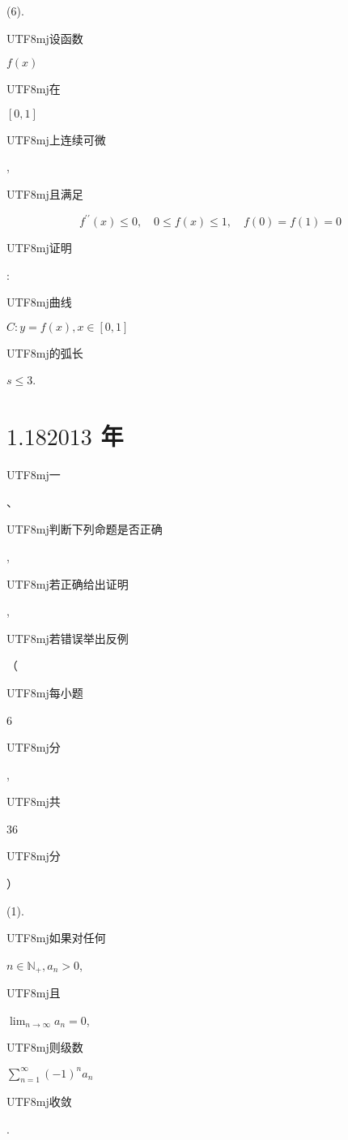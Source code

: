 \documentclass[10pt]{article}
\begin{document}
(6). \begin{CJK}{UTF8}{mj}设函数\end{CJK} $f(x)$ \begin{CJK}{UTF8}{mj}在\end{CJK} $[0,1]$ \begin{CJK}{UTF8}{mj}上连续可微\end{CJK}, \begin{CJK}{UTF8}{mj}且满足\end{CJK}
$$
f^{\prime \prime}(x) \leqslant 0, \quad 0 \leqslant f(x) \leqslant 1, \quad f(0)=f(1)=0
$$
\begin{CJK}{UTF8}{mj}证明\end{CJK}: \begin{CJK}{UTF8}{mj}曲线\end{CJK} $C: y=f(x), x \in[0,1]$ \begin{CJK}{UTF8}{mj}的弧长\end{CJK} $s \leqslant 3$.

\section{$1.182013$ 年}
\begin{CJK}{UTF8}{mj}一\end{CJK}、\begin{CJK}{UTF8}{mj}判断下列命题是否正确\end{CJK}, \begin{CJK}{UTF8}{mj}若正确给出证明\end{CJK}, \begin{CJK}{UTF8}{mj}若错误举出反例\end{CJK}（\begin{CJK}{UTF8}{mj}每小题\end{CJK} 6 \begin{CJK}{UTF8}{mj}分\end{CJK}, \begin{CJK}{UTF8}{mj}共\end{CJK} 36 \begin{CJK}{UTF8}{mj}分\end{CJK}）

(1). \begin{CJK}{UTF8}{mj}如果对任何\end{CJK} $n \in \mathbb{N}_{+}, a_{n}>0$, \begin{CJK}{UTF8}{mj}且\end{CJK} $\lim _{n \rightarrow \infty} a_{n}=0$, \begin{CJK}{UTF8}{mj}则级数\end{CJK} $\sum_{n=1}^{\infty}(-1)^{n} a_{n}$ \begin{CJK}{UTF8}{mj}收敛\end{CJK}.
\end{document}
